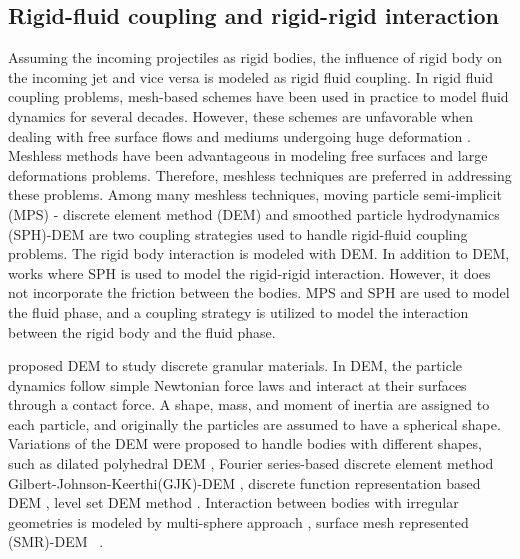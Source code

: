 \subsection{Rigid-fluid coupling and rigid-rigid interaction}
Assuming the incoming projectiles as rigid bodies, the influence of rigid body
on the incoming jet and vice versa is modeled as rigid fluid coupling. In rigid
fluid coupling problems, mesh-based schemes \citep{dettmer_computational_2006}
have been used in practice to model fluid dynamics for several decades. However,
these schemes are unfavorable when dealing with free surface flows and mediums
undergoing huge deformation \citep{walkley_finite_2005}. Meshless methods have
been advantageous in modeling free surfaces and large deformations problems.
Therefore, meshless techniques are preferred in addressing these problems. Among
many meshless techniques, moving particle semi-implicit (MPS) - discrete element
method (DEM) \citep{guo2017numerical} and smoothed particle hydrodynamics
(SPH)-DEM \citep{canelas2016sph} are two coupling strategies used to handle
rigid-fluid coupling problems. The rigid body interaction is modeled with DEM.
In addition to DEM, works where SPH \citep{amicarelli2015smoothed} is used to
model the rigid-rigid interaction. However, it does not incorporate the friction
between the bodies. MPS and SPH are used to model the fluid phase, and a
coupling strategy is utilized to model the interaction between the rigid body
and the fluid phase.

\cite{cundall_discrete_1979} proposed DEM to study discrete granular materials.
In DEM, the particle dynamics follow simple Newtonian force laws and interact at
their surfaces through a contact force. A shape, mass, and moment of inertia are
assigned to each particle, and originally the particles are assumed to have a
spherical shape. Variations of the DEM were proposed to handle bodies with
different shapes, such as dilated polyhedral DEM \citep{liu_new_2020}, Fourier
series-based discrete element method \citep{lai_fourier_2020}
Gilbert-Johnson-Keerthi(GJK)-DEM \citep{wachs2012grains3d}, discrete function
representation based DEM \citep{lu2012critical}, level set DEM method
\citep{duriez2021precision}. Interaction between bodies with irregular
geometries is modeled by multi-sphere approach \citep{kruggel-emden_study_2008},
surface mesh represented (SMR)-DEM ~\citep{zhan2021surface}.

